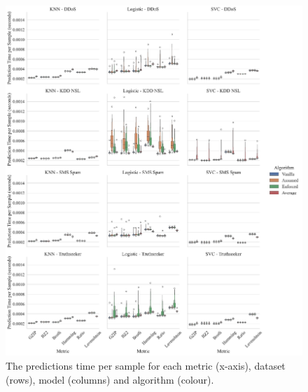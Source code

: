 \documentclass[conference]{IEEEtran}
\begin{document}
\begin{figure}[htb]
    \includegraphics[width=\textwidth]{images/pred_time_vs_algorithm.pdf}
    \caption{The predictions time per sample for each metric (x-axis), dataset (rows), model (columns) and algorithm (colour).}
    \label{fig:pred_time}
\end{figure}
\end{document}
